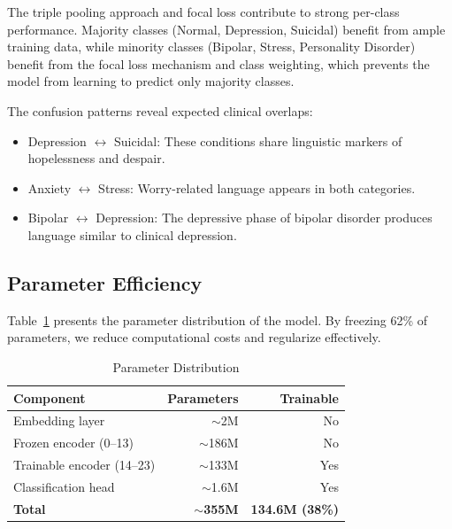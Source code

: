 \documentclass[conference, 10pt]{IEEEtran}
\begin{document}
The triple pooling approach and focal loss contribute to strong per-class performance. Majority classes (Normal, Depression, Suicidal) benefit from ample training data, while minority classes (Bipolar, Stress, Personality Disorder) benefit from the focal loss mechanism and class weighting, which prevents the model from learning to predict only majority classes.

The confusion patterns reveal expected clinical overlaps:
\begin{itemize}[noitemsep]
    \item Depression $\leftrightarrow$ Suicidal: These conditions share linguistic markers of hopelessness and despair.
    \item Anxiety $\leftrightarrow$ Stress: Worry-related language appears in both categories.
    \item Bipolar $\leftrightarrow$ Depression: The depressive phase of bipolar disorder produces language similar to clinical depression.
\end{itemize}

\subsection{Parameter Efficiency}

Table~\ref{tab:params} presents the parameter distribution of the model. By freezing 62\% of parameters, we reduce computational costs and regularize effectively.

\begin{table}[t]
    \centering
    \caption{Parameter Distribution}
    \label{tab:params}
    \begin{tabular}{lrr}
        \toprule
        \textbf{Component} & \textbf{Parameters} & \textbf{Trainable} \\
        \midrule
        Embedding layer            & $\sim$2M    & No \\
        Frozen encoder (0--13)     & $\sim$186M  & No \\
        Trainable encoder (14--23) & $\sim$133M  & Yes \\
        Classification head        & $\sim$1.6M  & Yes \\
        \midrule
        \textbf{Total}             & $\sim$\textbf{355M} & \textbf{134.6M (38\%)} \\
        \bottomrule
    \end{tabular}
\end{table}


\end{document}
